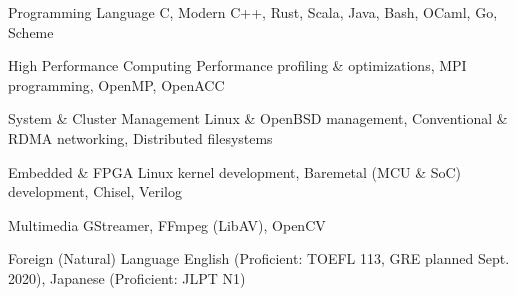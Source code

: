 

\begin{cvskills}

  \cvskill
    {Programming Language} %
    {C, Modern C++, Rust, Scala, Java, Bash, OCaml, Go, Scheme} %

  \cvskill
    {High Performance Computing} %
    {Performance profiling \& optimizations, MPI programming, OpenMP, OpenACC} %

  \cvskill
    {System \& Cluster Management} %
    {Linux \& OpenBSD management, Conventional \& RDMA networking, Distributed filesystems} %

  \cvskill
    {Embedded \& FPGA}
    {Linux kernel development, Baremetal (MCU \& SoC) development, Chisel, Verilog}

  \cvskill
    {Multimedia}
    {GStreamer, FFmpeg (LibAV), OpenCV}

  \cvskill
    {Foreign (Natural) Language} %
    {English (Proficient: TOEFL 113, GRE planned Sept. 2020), Japanese (Proficient: JLPT N1)} %

\end{cvskills}
